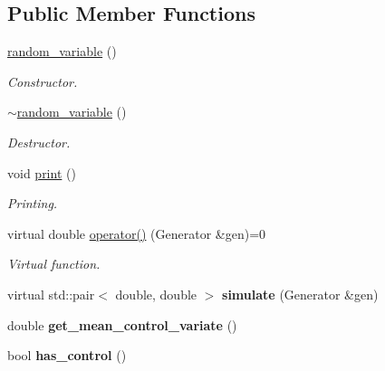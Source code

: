 \subsection*{Public Member Functions}
\begin{DoxyCompactItemize}
\item 
\hyperlink{classrandom__variable_a6dbf2b284fff6629a1bf61ed5f63b1db}{random\+\_\+variable} ()\hypertarget{classrandom__variable_a6dbf2b284fff6629a1bf61ed5f63b1db}{}\label{classrandom__variable_a6dbf2b284fff6629a1bf61ed5f63b1db}

\begin{DoxyCompactList}\small\item\em Constructor. \end{DoxyCompactList}\item 
\hyperlink{classrandom__variable_ae9066f6c557c9b64233f087bd2dfb6b1}{$\sim$random\+\_\+variable} ()\hypertarget{classrandom__variable_ae9066f6c557c9b64233f087bd2dfb6b1}{}\label{classrandom__variable_ae9066f6c557c9b64233f087bd2dfb6b1}

\begin{DoxyCompactList}\small\item\em Destructor. \end{DoxyCompactList}\item 
void \hyperlink{classrandom__variable_aa3b0e1dfeb750216df2043e96f72c017}{print} ()\hypertarget{classrandom__variable_aa3b0e1dfeb750216df2043e96f72c017}{}\label{classrandom__variable_aa3b0e1dfeb750216df2043e96f72c017}

\begin{DoxyCompactList}\small\item\em Printing. \end{DoxyCompactList}\item 
virtual double \hyperlink{classrandom__variable_a661cc29297837ef5aba0b7e476f114b2}{operator()} (Generator \&gen)=0\hypertarget{classrandom__variable_a661cc29297837ef5aba0b7e476f114b2}{}\label{classrandom__variable_a661cc29297837ef5aba0b7e476f114b2}

\begin{DoxyCompactList}\small\item\em Virtual function. \end{DoxyCompactList}\item 
virtual std\+::pair$<$ double, double $>$ {\bfseries simulate} (Generator \&gen)\hypertarget{classrandom__variable_adc681ee20a16d59d75288c4faa969a50}{}\label{classrandom__variable_adc681ee20a16d59d75288c4faa969a50}

\item 
double {\bfseries get\+\_\+mean\+\_\+control\+\_\+variate} ()\hypertarget{classrandom__variable_a1ece3619941def5190b80fd0153e4ef6}{}\label{classrandom__variable_a1ece3619941def5190b80fd0153e4ef6}

\item 
bool {\bfseries has\+\_\+control} ()\hypertarget{classrandom__variable_afae88ea0382990482784b3e16bbb6013}{}\label{classrandom__variable_afae88ea0382990482784b3e16bbb6013}

\end{DoxyCompactItemize}
